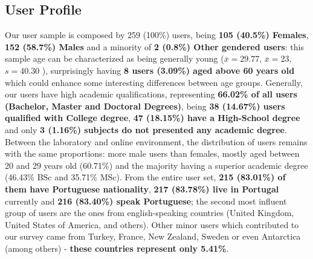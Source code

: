 \subsection{User Profile}
%
Our user sample is composed by 259 (100\%) users, being \textbf{105 (40.5\%) Females}, \textbf{152
(58.7\%) Males} and a minority of \textbf{2 (0.8\%) Other gendered users}: this sample age can
be characterized as being generally young ($\overline{x} = 29.77$, $\overline{x} = 23$, $s = 40.30$ ),
surprisingly having \textbf{8 users (3.09\%) aged above 60 years old} which could enhance some interesting
differences between age groups. Generally, our users have high academic qualifications, representing
\textbf{66.02\% of all users (Bachelor, Master and Doctoral Degrees)}, being \textbf{38 (14.67\%) users
qualified with College degree}, \textbf{47 (18.15\%) have a High-School degree} and only \textbf{3 (1.16\%)
subjects do not presented any academic degree}. Between the laboratory and online environment, the
distribution of users remains with the same proportions: more male users than females, mostly aged
between 20 and 29 years old (60.71\%) and the majority having a superior academic degree (46.43\% BSc
and 35.71\% MSc). From the entire user set, \textbf{215 (83.01\%) of them have Portuguese nationality},
\textbf{217 (83.78\%) live in Portugal} currently and \textbf{216 (83.40\%) speak Portuguese}; the second
most influent group of users are the ones from english-speaking countries (United Kingdom, United States
of America, and others). Other minor users which contributed to our survey came from Turkey, France, New
Zealand, Sweden or even Antarctica (among others) - \textbf{these countries represent only 5.41\%}.\par


